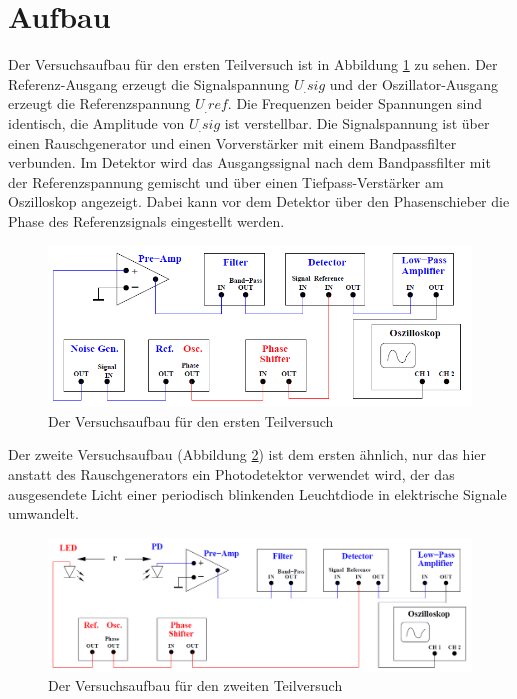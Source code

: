 \section{Aufbau}
\label{sec:Aufbau}

Der Versuchsaufbau für den ersten Teilversuch ist in Abbildung \ref{fig:Aufbau1} zu sehen. Der Referenz-Ausgang erzeugt die Signalspannung $U_.{sig}$ und der Oszillator-Ausgang erzeugt die Referenzspannung $U_.{ref}$. Die Frequenzen beider Spannungen sind identisch, die Amplitude von $U_.{sig}$ ist verstellbar. Die Signalspannung ist über einen Rauschgenerator und einen Vorverstärker mit einem Bandpassfilter verbunden. Im Detektor wird das Ausgangssignal nach dem Bandpassfilter mit der Referenzspannung gemischt und über einen Tiefpass-Verstärker am Oszilloskop angezeigt. Dabei kann vor dem Detektor über den Phasenschieber die Phase des Referenzsignals eingestellt werden.

\begin{figure}
	\centering
	\includegraphics[width=\linewidth-40pt,height=\textheight-40pt,keepaspectratio]{content/images/Aufbau1.png}
	\caption{Der Versuchsaufbau für den ersten Teilversuch\cite{V303}}
	\label{fig:Aufbau1}
\end{figure}

\noindent Der zweite Versuchsaufbau (Abbildung \ref{fig:Aufbau2}) ist dem ersten ähnlich, nur das hier anstatt des Rauschgenerators ein Photodetektor verwendet wird, der das ausgesendete Licht einer periodisch blinkenden Leuchtdiode in elektrische Signale umwandelt.

\begin{figure}
	\centering
	\includegraphics[width=\linewidth,height=\textheight,keepaspectratio]{content/images/Aufbau2.png}
	\caption{Der Versuchsaufbau für den zweiten Teilversuch\cite{V303}}
	\label{fig:Aufbau2}
\end{figure}